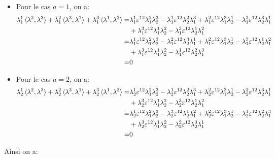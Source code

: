\documentclass[12pt, a4paper]{article}
\begin{document}
	\begin{itemize}
	\item Pour le cas \(a=1\), on a:
	\begin{equation}
		\begin{split}
			\lambda^1_1 \braket{\lambda^2, \lambda^3} + \lambda^2_1 \braket{\lambda^3, \lambda^1} + \lambda^3_1
			\braket{\lambda^1, \lambda^2}
			=
			&\lambda^1_1 \varepsilon^{12} \lambda^2_1 \lambda^3_2 -
			\lambda^1_1 \varepsilon^{12} \lambda^2_2 \lambda^3_1 +
			\lambda^2_1 \varepsilon^{12} \lambda^3_1 \lambda^1_2 -
			\lambda^2_1 \varepsilon^{12} \lambda^3_2 \lambda^1_1 \\
			&+\lambda^3_1 \varepsilon^{12} \lambda^1_1 \lambda^2_2 -
			\lambda^3_1 \varepsilon^{12} \lambda^1_2 \lambda^2_1\\
			=
			&\lambda^1_1 \varepsilon^{12} \lambda^2_1 \lambda^3_2 -
			\lambda^2_1 \varepsilon^{12} \lambda^3_2 \lambda^1_1 +
			\lambda^2_1 \varepsilon^{12} \lambda^3_1 \lambda^1_2 -
			\lambda^3_1 \varepsilon^{12} \lambda^1_2 \lambda^2_1 \\
			&+\lambda^3_1 \varepsilon^{12} \lambda^1_1 \lambda^2_2 -
			\lambda^1_1 \varepsilon^{12} \lambda^2_2 \lambda^3_1 \\
			=&0\\
		\end{split}
	\end{equation}
	\item Pour le cas \(a=2\), on a:
	\begin{equation}
		\begin{split}
			\lambda^1_2 \braket{\lambda^2, \lambda^3} + \lambda^2_2 \braket{\lambda^3, \lambda^1} + \lambda^3_2
			\braket{\lambda^1, \lambda^2}
			=
			&\lambda^1_2 \varepsilon^{12} \lambda^2_1 \lambda^3_2 -
			\lambda^1_2 \varepsilon^{12} \lambda^2_2 \lambda^3_1 +
			\lambda^2_2 \varepsilon^{12} \lambda^3_1 \lambda^1_2 -
			\lambda^2_2 \varepsilon^{12} \lambda^3_2 \lambda^1_1 \\
			&+\lambda^3_2 \varepsilon^{12} \lambda^1_1 \lambda^2_2 -
			\lambda^3_2 \varepsilon^{12} \lambda^1_2 \lambda^2_1\\
			=
			&\lambda^1_2 \varepsilon^{12} \lambda^2_1 \lambda^3_2 -
			\lambda^3_2 \varepsilon^{12} \lambda^1_2 \lambda^2_1 +
			\lambda^2_2 \varepsilon^{12} \lambda^3_1 \lambda^1_2 -
			\lambda^1_2 \varepsilon^{12} \lambda^2_2 \lambda^3_1  \\
			&+\lambda^3_2 \varepsilon^{12} \lambda^1_1 \lambda^2_2 -
			\lambda^2_2 \varepsilon^{12} \lambda^3_2 \lambda^1_1 \\
			=&0\\
		\end{split}
	\end{equation}
	\end{itemize}
	Ainsi on a:
		
	
	
	
	
	
	
	
\end{document}
